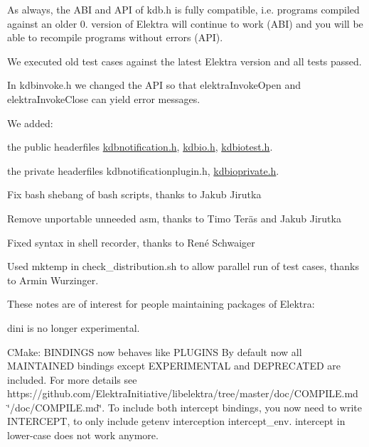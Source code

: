As always, the A\+BI and A\+PI of kdb.\+h is fully compatible, i.\+e. programs compiled against an older 0. version of Elektra will continue to work (A\+BI) and you will be able to recompile programs without errors (A\+PI).

We executed old test cases against the latest Elektra version and all tests passed.

In {\ttfamily kdbinvoke.\+h} we changed the A\+PI so that {\ttfamily elektra\+Invoke\+Open} and {\ttfamily elektra\+Invoke\+Close} can yield error messages.

We added\+:


\begin{DoxyItemize}
\item the public headerfiles {\ttfamily \hyperlink{kdbnotification_8h}{kdbnotification.\+h}}, {\ttfamily \hyperlink{kdbio_8h}{kdbio.\+h}}, {\ttfamily \hyperlink{kdbiotest_8h}{kdbiotest.\+h}}.
\item the private headerfiles {\ttfamily kdbnotificationplugin.\+h}, {\ttfamily \hyperlink{kdbioprivate_8h}{kdbioprivate.\+h}}.
\end{DoxyItemize}


\begin{DoxyItemize}
\item Fix bash shebang of bash scripts, thanks to Jakub Jirutka
\item Remove unportable unneeded asm, thanks to Timo Teräs and Jakub Jirutka
\item Fixed syntax in shell recorder, thanks to René Schwaiger
\item Used {\ttfamily mktemp} in {\ttfamily check\+\_\+distribution.\+sh} to allow parallel run of test cases, thanks to Armin Wurzinger.
\end{DoxyItemize}

These notes are of interest for people maintaining packages of Elektra\+:


\begin{DoxyItemize}
\item {\ttfamily dini} is no longer experimental.
\item C\+Make\+: {\ttfamily B\+I\+N\+D\+I\+N\+GS} now behaves like {\ttfamily P\+L\+U\+G\+I\+NS} By default now all M\+A\+I\+N\+T\+A\+I\+N\+ED bindings except E\+X\+P\+E\+R\+I\+M\+E\+N\+T\+AL and D\+E\+P\+R\+E\+C\+A\+T\+ED are included. For more details see https\+://github.com/\+Elektra\+Initiative/libelektra/tree/master/doc/\+C\+O\+M\+P\+I\+L\+E.\+md \char`\"{}/doc/\+C\+O\+M\+P\+I\+L\+E.\+md\char`\"{}. To include both intercept bindings, you now need to write {\ttfamily I\+N\+T\+E\+R\+C\+E\+PT}, to only include getenv interception {\ttfamily intercept\+\_\+env}. {\ttfamily intercept} in lower-\/case does not work anymore.
\end{DoxyItemize}

